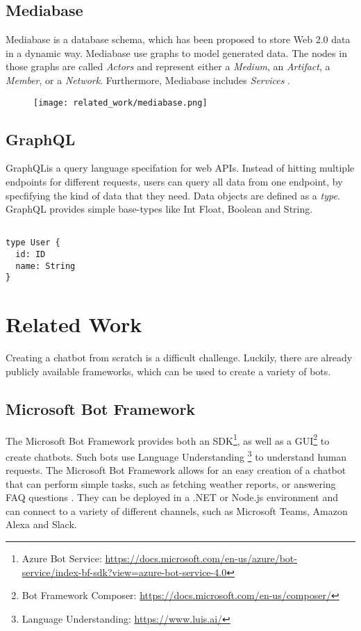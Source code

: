 \subsection{Mediabase}
Mediabase is a database schema, which has been proposed to store Web 2.0 data in a dynamic way. Mediabase use graphs to model generated data. The nodes in those graphs are called \emph{Actors} and represent either a \emph{ Medium}, an \emph {Artifact}, a \emph{Member}, or a \emph{Network}. Furthermore, Mediabase includes \emph{Services} \cite{KlPe08}.
\begin{figure}
	\centering
	\texttt{[image: related\_work/mediabase.png]}
\end{figure}


\subsection{GraphQL}
GraphQL\footnotemark is a query language specifation for web APIs. Instead of hitting multiple endpoints for different requests, users can query all data from one endpoint, by specfifying the kind of data that they need. Data objects are defined as a \emph{type}. GraphQL provides simple base-types like Int Float, Boolean and String.
\begin{lstlisting}[caption={Example of a GraphQL schema},captionpos=b]
    
type User {
  id: ID
  name: String
}
\end{lstlisting}


\section{Related Work} \label{lab:relWork}

Creating a chatbot from scratch is a difficult challenge. Luckily, there are already publicly available frameworks, which can be used to create a variety of bots.

\subsection{Microsoft Bot Framework}
The Microsoft Bot Framework provides both an SDK\footnote{Azure Bot Service: \href{https://docs.microsoft.com/en-us/azure/bot-service/index-bf-sdk?view=azure-bot-service-4.0}{https://docs.microsoft.com/en-us/azure/bot-service/index-bf-sdk?view=azure-bot-service-4.0}}, as well as a GUI\footnote{Bot Framework Composer: \href{https://docs.microsoft.com/en-us/composer/}{https://docs.microsoft.com/en-us/composer/}} to create chatbots. Such bots use Language Understanding \footnote{Language Understanding: \href{https://www.luis.ai/}{https://www.luis.ai/}} to understand human requests. The Microsoft Bot Framework allows for an easy creation of a chatbot that can perform simple tasks, such as fetching weather reports, or answering FAQ questions \cite{CaWh14}. They can be deployed in a .NET or Node.js environment and can connect to a variety of different channels, such as Microsoft Teams, Amazon Alexa and Slack.

